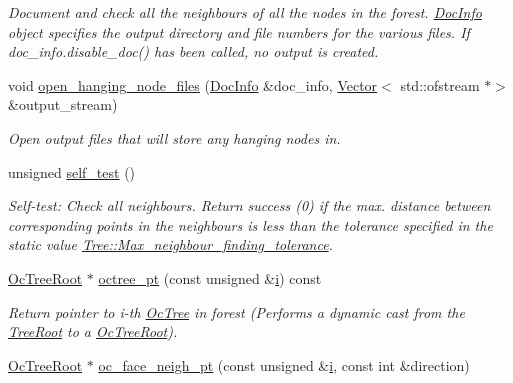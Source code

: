 \begin{DoxyCompactItemize}
\begin{DoxyCompactList}\small\item\em Document and check all the neighbours of all the nodes in the forest. \hyperlink{classoomph_1_1DocInfo}{Doc\+Info} object specifies the output directory and file numbers for the various files. If {\ttfamily doc\+\_\+info.\+disable\+\_\+doc()} has been called, no output is created. \end{DoxyCompactList}\item 
void \hyperlink{classoomph_1_1OcTreeForest_a6d8d84745819ea3ed42a76d7e1fac3a5}{open\+\_\+hanging\+\_\+node\+\_\+files} (\hyperlink{classoomph_1_1DocInfo}{Doc\+Info} \&doc\+\_\+info, \hyperlink{classoomph_1_1Vector}{Vector}$<$ std\+::ofstream $\ast$$>$ \&output\+\_\+stream)
\begin{DoxyCompactList}\small\item\em Open output files that will store any hanging nodes in. \end{DoxyCompactList}\item 
unsigned \hyperlink{classoomph_1_1OcTreeForest_ac9517c21654bbbe1aa59af28455a40e4}{self\+\_\+test} ()
\begin{DoxyCompactList}\small\item\em Self-\/test\+: Check all neighbours. Return success (0) if the max. distance between corresponding points in the neighbours is less than the tolerance specified in the static value \hyperlink{classoomph_1_1Tree_aef9abebc166fa3bf81ecb59ec0d5d6b2}{Tree\+::\+Max\+\_\+neighbour\+\_\+finding\+\_\+tolerance}. \end{DoxyCompactList}\item 
\hyperlink{classoomph_1_1OcTreeRoot}{Oc\+Tree\+Root} $\ast$ \hyperlink{classoomph_1_1OcTreeForest_aa51c75e4ffadde74c38511e21c0081e4}{octree\+\_\+pt} (const unsigned \&\hyperlink{cfortran_8h_adb50e893b86b3e55e751a42eab3cba82}{i}) const
\begin{DoxyCompactList}\small\item\em Return pointer to i-\/th \hyperlink{classoomph_1_1OcTree}{Oc\+Tree} in forest (Performs a dynamic cast from the \hyperlink{classoomph_1_1TreeRoot}{Tree\+Root} to a \hyperlink{classoomph_1_1OcTreeRoot}{Oc\+Tree\+Root}). \end{DoxyCompactList}\item 
\hyperlink{classoomph_1_1OcTreeRoot}{Oc\+Tree\+Root} $\ast$ \hyperlink{classoomph_1_1OcTreeForest_a796fe9ebeefb043d7b6d5ddacd9e234c}{oc\+\_\+face\+\_\+neigh\+\_\+pt} (const unsigned \&\hyperlink{cfortran_8h_adb50e893b86b3e55e751a42eab3cba82}{i}, const int \&direction)
$$
\end{DoxyCompactItemize}

